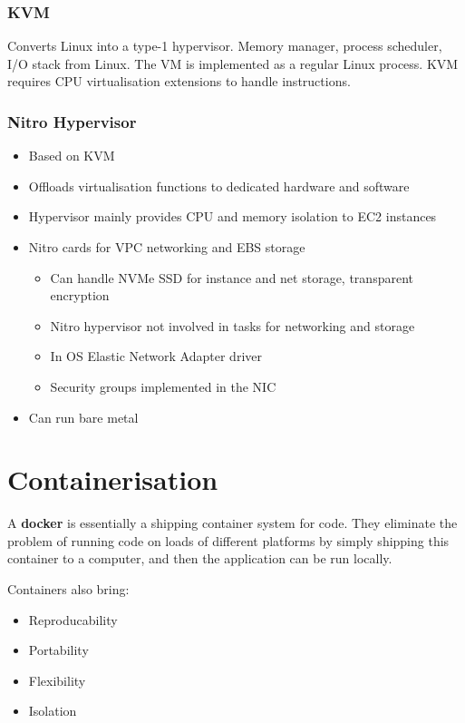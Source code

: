 \documentclass[11pt,a4paper,titlepage,dvipsnames,cmyk]{scrartcl}
\begin{document}
\subsubsection{KVM}
Converts Linux into a type-1 hypervisor. Memory manager, process scheduler, I/O stack from Linux. The VM is implemented as a regular Linux process. KVM requires CPU virtualisation extensions to handle instructions.

\subsubsection{Nitro Hypervisor}
\begin{itemize}
    \item Based on KVM
    \item Offloads virtualisation functions to dedicated hardware and software
    \item Hypervisor mainly provides CPU and memory isolation to EC2 instances
    \item Nitro cards for VPC networking and EBS storage
    \begin{itemize}
        \item Can handle NVMe SSD for instance and net storage, transparent encryption
        \item Nitro hypervisor not involved in tasks for networking and storage
        \item In OS Elastic Network Adapter driver
        \item Security groups implemented in the NIC
    \end{itemize}
    \item Can run bare metal
\end{itemize}

\section{Containerisation}
A \textbf{docker} is essentially a shipping container system for code. They eliminate the problem of running code on loads of different platforms by simply shipping this container to a computer, and then the application can be run locally.

Containers also bring:
\begin{itemize}
    \item Reproducability
    \item Portability
    \item Flexibility
    \item Isolation
\end{itemize}
\end{document}
